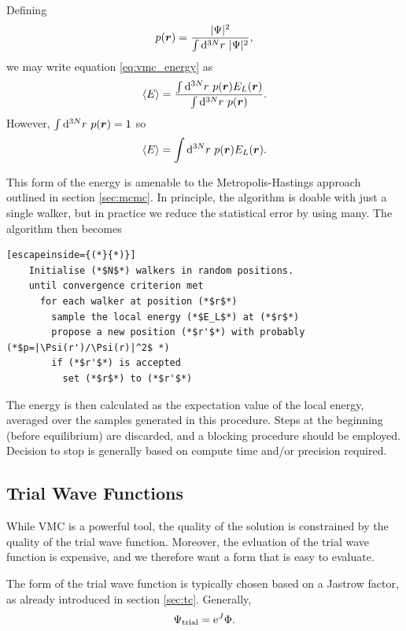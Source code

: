 Defining
\begin{equation}
    p(\bm r) = \frac{|\Psi|^2}{\int\mathrm{d}^{3N}r\ |\Psi|^2},
\end{equation}
we may write equation \ref{eq:vmc_energy} as
\begin{equation}
    \langle E\rangle = \frac{\int\mathrm{d}^{3N}r\ p(\bm r)E_L(\bm r)}{\int\mathrm{d}^{3N}r\ p(\bm r)}.
\end{equation}
However, $\int\mathrm{d}^{3N}r\ p(\bm r) = 1$ so
\begin{equation}
    \langle E\rangle = \int\mathrm{d}^{3N}r\ p(\bm r)E_L(\bm r).
\end{equation}

This form of the energy is amenable to the Metropolis-Hastings approach outlined in section \ref{sec:mcmc}. In principle, the algorithm is doable with just a single walker, but in practice we reduce the statistical error by using many. The algorithm then becomes

\begin{minipage}{\textwidth}
\begin{lstlisting}[escapeinside={(*}{*)}]
    Initialise (*$N$*) walkers in random positions.
    until convergence criterion met
      for each walker at position (*$r$*)
        sample the local energy (*$E_L$*) at (*$r$*)
        propose a new position (*$r'$*) with probably (*$p=|\Psi(r')/\Psi(r)|^2$ *)
        if (*$r'$*) is accepted
          set (*$r$*) to (*$r'$*)
\end{lstlisting}
\end{minipage}

The energy is then calculated as the expectation value of the local energy, averaged over the samples generated in this procedure. Steps at the beginning (before equilibrium) are discarded, and a blocking procedure should be employed. Decision to stop is generally based on compute time and/or precision required.


\subsection{Trial Wave Functions}
\label{sec:jastrow}

While \gls{VMC} is a powerful tool, the quality of the solution is constrained by the quality of the trial wave function. Moreover, the evluation of the trial wave function is expensive, and we therefore want a form that is easy to evaluate.

The form of the trial wave function is typically chosen based on a Jastrow factor, as already introduced in section \ref{sec:tc}. Generally,\supercite{jastrowManyBody1955}
\begin{equation}
    \Psi_\mathrm{trial} = \mathrm{e}^J\Phi.
\end{equation}

